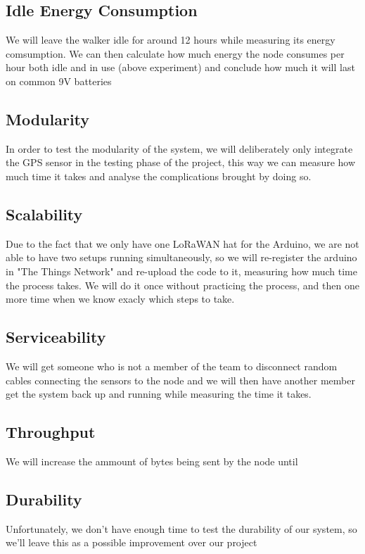 	\subsection{Idle Energy Consumption}
		We will leave the walker idle for around 12 hours while measuring its energy comsumption.
		We can then calculate how much energy the node consumes per hour both idle and in use (above experiment) and conclude how much it will last on common 9V batteries

	\subsection{Modularity}
		In order to test the modularity of the system, we will deliberately only integrate the GPS sensor in the testing phase of the project, this way we can measure how much time it takes and analyse the complications brought by doing so.

	\subsection{Scalability}
		Due to the fact that we only have one LoRaWAN hat for the Arduino, we are not able to have two setups running simultaneously, so we will re-register the arduino in "The Things Network" and re-upload the code to it, measuring how much time the process takes. We will do it once without practicing the process, and then one more time when we know exacly which steps to take.

	\subsection{Serviceability}
		We will get someone who is not a member of the team to disconnect random cables connecting the sensors to the node and we will then have another member get the system back up and running while measuring the time it takes.

	\subsection{Throughput}
		We will increase the ammount of bytes being sent by the node until 

	\subsection{Durability}
		Unfortunately, we don’t have enough time to test the durability of our system, so we’ll leave this as a possible improvement over our project



